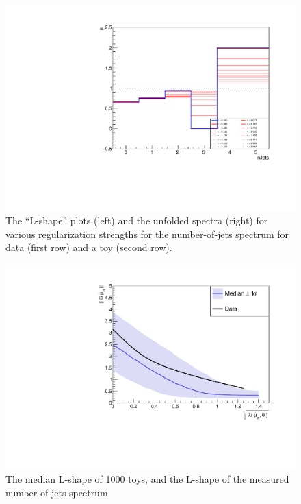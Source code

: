 \begin{figure}[ht]
\begin{center}
   \includegraphics[width=\halflinewidth]{img/differentials/regularization/seed7003_SeveralUnfoldedSpectra.pdf}
   \caption{The ``L-shape'' plots (left) and the unfolded spectra (right) for various regularization strengths for the number-of-jets spectrum for data (first row) and a toy (second row).}
   \label{fig:regularizationtoystudy}
 \end{center}
\end{figure}


\begin{figure}[ht]
 \begin{center}
   \includegraphics[width=\halflinewidth]{img/differentials/regularization/combinedLshapes_Median_better.pdf}
   \caption{ The median L-shape of 1000 toys, and the L-shape of the measured number-of-jets spectrum. }
   \label{fig:median}
 \end{center}
\end{figure}

